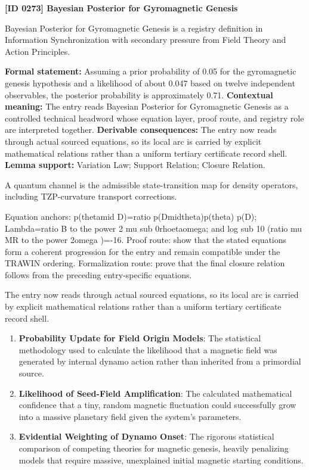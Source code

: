 \clearpage
\noindent\textbf{[ID 0273] Bayesian Posterior for Gyromagnetic Genesis}\par
\vspace{0.35em}
\begingroup\small
{}
Bayesian Posterior for Gyromagnetic Genesis is a registry definition in Information Synchronization with secondary pressure from Field Theory and Action Principles.

\begingroup\footnotesize\setlength{\emergencystretch}{3em}\sloppy
\textbf{Formal statement:} Assuming a prior probability of 0.05 for the gyromagnetic genesis hypothesis and a likelihood of about 0.047 based on twelve independent observables, the posterior probability is approximately 0.71. \textbf{Contextual meaning:} The entry reads Bayesian Posterior for Gyromagnetic Genesis as a controlled technical headword whose equation layer, proof route, and registry role are interpreted together. \textbf{Derivable consequences:} The entry now reads through actual sourced equations, so its local arc is carried by explicit mathematical relations rather than a uniform tertiary certificate record shell. \textbf{Lemma support:} Variation Law; Support Relation; Closure Relation.\par
\endgroup

A quantum channel is the admissible state-transition map for density operators, including TZP-curvature transport corrections.

Equation anchors: p(thetamid D)=ratio p(Dmidtheta)p(theta) p(D); Lambda=ratio B to the power 2 mu sub 0rhoetaomega; and log sub 10 (ratio mu MR to the power 2omega )=-16. Proof route: show that the stated equations form a coherent progression for the entry and remain compatible under the TRAWIN ordering. Formalization route: prove that the final closure relation follows from the preceding entry-specific equations.

The entry now reads through actual sourced equations, so its local arc is carried by explicit mathematical relations rather than a uniform tertiary certificate record shell.
\endgroup

\begin{enumerate}[leftmargin=1.6em,itemsep=6pt,topsep=4pt]
\item \textbf{Probability Update for Field Origin Models}: The statistical methodology used to calculate the likelihood that a magnetic field was generated by internal dynamo action rather than inherited from a primordial source.
\item \textbf{Likelihood of Seed-Field Amplification}: The calculated mathematical confidence that a tiny, random magnetic fluctuation could successfully grow into a massive planetary field given the system's parameters.
\item \textbf{Evidential Weighting of Dynamo Onset}: The rigorous statistical comparison of competing theories for magnetic genesis, heavily penalizing models that require massive, unexplained initial magnetic starting conditions.
\end{enumerate}


